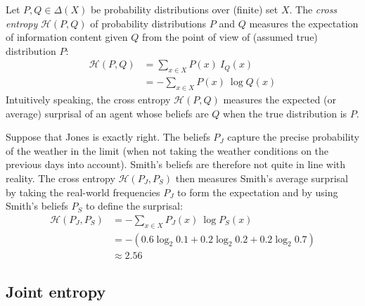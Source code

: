\documentclass[nobib,nofonts]{tufte-handout}
\begin{document}
Let $P, Q \in \Delta(X)$ be probability distributions over (finite) set $X$.
The \emph{cross entropy} $\mathcal{H}(P,Q)$ of probability distributions $P$ and $Q$ measures the expectation of information content given $Q$ from the point of view of (assumed true) distribution $P$:
\begin{align*}
  \mathcal{H}(P,Q) & = \sum_{x \in X} P(x) \ I_{Q}(x) \\
                   & = - \sum_{x \in X} P(x) \ \log Q(x)
\end{align*}
Intuitively speaking, the cross entropy $\mathcal{H}(P,Q)$ measures the expected (or average) surprisal of an agent whose beliefs are $Q$ when the true distribution is $P$.

\begin{example}
  Suppose that Jones is exactly right.
  The beliefs $P_{J}$ capture the precise probability of the weather in the limit (when not taking the weather conditions on the previous days into account).
  Smith's beliefs are therefore not quite in line with reality.
  The cross entropy $\mathcal{H}(P_{J}, P_{S})$ then measures Smith's average surprisal by taking the real-world frequencies $P_{J}$ to form the expectation and by using Smith's beliefs $P_{S}$ to define the surprisal:
  \begin{align*}
    \mathcal{H}(P_{J}, P_{S}) & = - \sum_{x \in X} P_{J}(x) \ \log P_{S}(x) \\
    & = -( 0.6 \log_{2} 0.1  +
    0.2 \log_{2} 0.2  +
      0.2 \log_{2} 0.7  ) \\
    & \approx 2.56
  \end{align*}
\end{example}


\subsection{Joint entropy}
\end{document}
